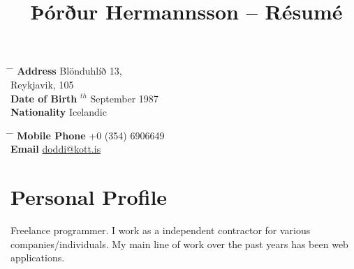 \documentclass[10pt]{article} %
\begin{document}

\title{Þórður Hermannsson -- Résumé} %


\parbox{0.5\textwidth}{ %
\begin{tabbing} %
\hspace{3cm} \= \hspace{4cm} \= \kill %
{\bf Address} \> Blönduhlíð 13,\\ %
\> Reykjavik, 105\\ %
{\bf Date of Birth} $^{th}$ September 1987\\ %
{\bf Nationality} \> Icelandic %
\end{tabbing}}
\hfill %
\parbox{0.5\textwidth}{ %
\begin{tabbing} %
\hspace{3cm} \= \hspace{4cm} \= \kill %
{\bf Mobile Phone} \> +0 (354) 6906649 \\ %
{\bf Email} \> \href{mailto:doddi@kott.is}{doddi@kott.is} \\ %
\end{tabbing}}


\section{Personal Profile}

Freelance programmer. I work as a independent contractor for various companies/individuals. 
My main line of work over the past years has been web applications.

\end{document}

